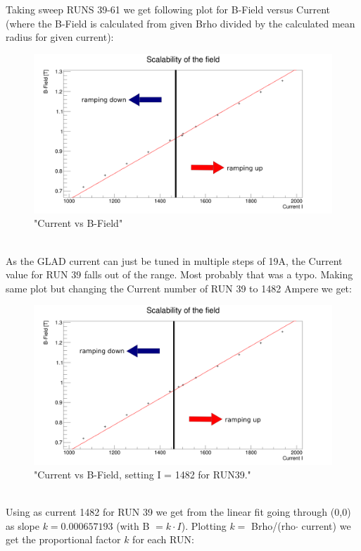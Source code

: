 \documentclass[12pt, letterpaper]{article}
\begin{document}
Taking sweep RUNS 39-61 we get following plot for B-Field versus Current (where the B-Field is calculated from given Brho divided by the calculated mean radius for given current):\\
\begin{figure}[!htbp]
	\centering
	\includegraphics[width=.9\linewidth]{scale_glad.png}
	\caption{"Current vs B-Field"}
\end{figure}
\\
As the GLAD current can just be tuned in multiple steps of 19A, the Current value for RUN 39 falls out of the range. Most probably that was a typo. Making same plot but changing the Current number of RUN 39 to 1482 Ampere we get:\\
\begin{figure}[!htbp]
	\centering
	\includegraphics[width=.9\linewidth]{scale_glad_corr.png}
	\caption{"Current vs B-Field, setting I = 1482 for RUN39."}
\end{figure}
\\
Using as current 1482 for RUN 39 we get from the linear fit going through (0,0) as slope $k = 0.000657193$ (with B $= k \cdot I$).
Plotting $k = $ Brho/(rho$\cdot$ current) we get the proportional factor $k$ for each RUN:
\end{document}
